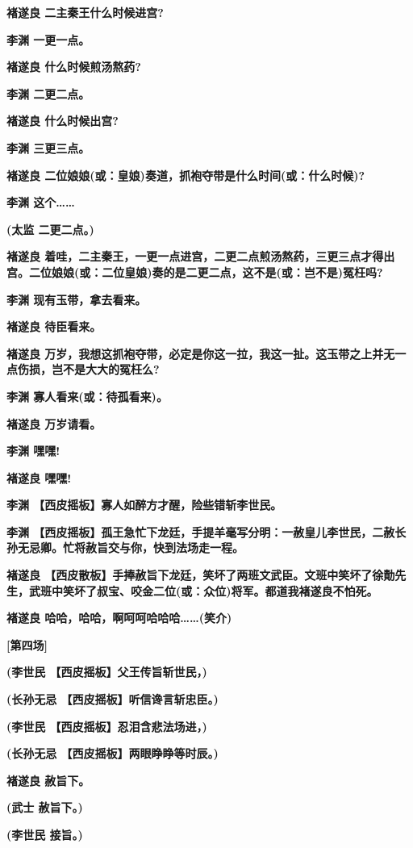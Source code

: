 \textbf{褚遂良 二主秦王什么时候进宫?}

\textbf{李渊 一更一点。}

\textbf{褚遂良 什么时候煎汤熬药?}

\textbf{李渊 二更二点。}

\textbf{褚遂良 什么时候出宫?}

\textbf{李渊 三更三点。}

\textbf{褚遂良
二位娘娘(或：皇娘)奏道，抓袍夺带是什么时间(或：什么时候)?}

\textbf{李渊 这个\ldots{}\ldots{}}

\textbf{(太监 二更二点。)}

\textbf{褚遂良
着哇，二主秦王，一更一点进宫，二更二点煎汤熬药，三更三点才得出宫。二位娘娘(或：二位皇娘)奏的是二更二点，这不是(或：岂不是)冤枉吗?}

\textbf{李渊 现有玉带，拿去看来。}

\textbf{褚遂良 待臣看来。}

\textbf{褚遂良
万岁，我想这抓袍夺带，必定是你这一拉，我这一扯。这玉带之上并无一点伤损，岂不是大大的冤枉么?}

\textbf{李渊 寡人看来(或：待孤看来)。}

\textbf{褚遂良 万岁请看。}

\textbf{李渊 嘿嘿!}

\textbf{褚遂良 嘿嘿!}

\textbf{李渊 【西皮摇板】寡人如醉方才醒，险些错斩李世民。}

\textbf{李渊
【西皮摇板】孤王急忙下龙廷，手提羊毫写分明：一赦皇儿李世民，二赦长孙无忌卿。忙将赦旨交与你，快到法场走一程。}

\textbf{褚遂良
【西皮散板】手捧赦旨下龙廷，笑坏了两班文武臣。文班中笑坏了徐勣先生，武班中笑坏了叔宝、咬金二位(或：众位)将军。都道我褚遂良不怕死。}

\textbf{褚遂良 哈哈，哈哈，啊呵呵哈哈哈\ldots{}\ldots{}(笑介)}

\textbf{{[}第四场{]}}

\textbf{(李世民 【西皮摇板】父王传旨斩世民，)}

\textbf{(长孙无忌 【西皮摇板】听信谗言斩忠臣。)}

\textbf{(李世民 【西皮摇板】忍泪含悲法场进，)}

\textbf{(长孙无忌 【西皮摇板】两眼睁睁等时辰。)}

\textbf{褚遂良 赦旨下。}

\textbf{(武士 赦旨下。)}

\textbf{(李世民 接旨。)}

